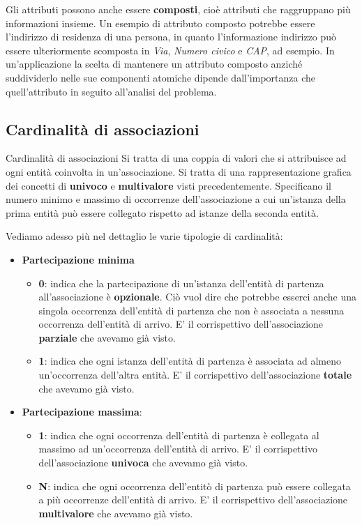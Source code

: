 \documentclass[12pt]{report}
\begin{document}
	Gli attributi possono anche essere \textbf{composti}, cioè attributi che raggruppano più informazioni insieme. Un esempio di attributo composto potrebbe essere l'indirizzo di residenza di una persona, in quanto l'informazione indirizzo può essere ulteriormente scomposta in \textit{Via}, \textit{Numero civico} e \textit{CAP}, ad esempio.
	In un'applicazione la scelta di mantenere un attributo composto anziché suddividerlo nelle sue componenti atomiche dipende dall'importanza che quell'attributo in seguito all'analisi del problema.
	
	\subsection{Cardinalità di associazioni}
	\begin{definizione}{Cardinalità di associazioni}{}
		Si tratta di una coppia di valori che si attribuisce ad ogni entità coinvolta in un'associazione. Si tratta di una rappresentazione grafica dei concetti di \textbf{univoco} e \textbf{multivalore} visti precedentemente.
		\smallbreak
		Specificano il numero minimo e massimo di occorrenze dell'associazione a cui un'istanza della prima entità può essere collegato rispetto ad istanze della seconda entità.
	\end{definizione}
	
	Vediamo adesso più nel dettaglio le varie tipologie di cardinalità:
	\begin{itemize}
		\item \textbf{Partecipazione minima}
		\begin{itemize}
			\item \textbf{0}: indica che la partecipazione di un'istanza dell'entità di partenza all'associazione è \textbf{opzionale}. Ciò vuol dire che potrebbe esserci anche una singola occorrenza dell'entità di partenza che non è associata a nessuna occorrenza dell'entità di arrivo. E' il corrispettivo dell'associazione \textbf{parziale} che avevamo già visto.
			
			\item \textbf{1}: indica che ogni istanza dell'entità di partenza è associata ad almeno un'occorrenza dell'altra entità. E' il corrispettivo dell'associazione \textbf{totale} che avevamo già visto.
		\end{itemize}
		
		\item \textbf{Partecipazione massima}:
		\begin{itemize}
			\item \textbf{1}: indica che ogni occorrenza dell'entità di partenza è collegata al massimo ad un'occorrenza dell'entità di arrivo. E' il corrispettivo dell'associazione \textbf{univoca} che avevamo già visto.
			
			\item \textbf{N}: indica che ogni occorrenza dell'entitò di partenza può essere collegata a più occorrenze dell'entità di arrivo. E' il corrispettivo dell'associazione \textbf{multivalore} che avevamo già visto.
		\end{itemize}
	\end{itemize}
	
\end{document}
